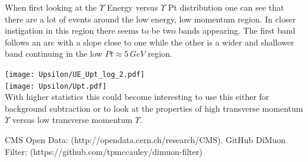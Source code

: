 \documentclass[a4paper, 11pt]{article}
\begin{document}
When first looking at the $\Upsilon$ Energy versus $\Upsilon$ Pt distribution one can see that there are a lot of events around the low energy, low momentum region.  In closer instigation in this region there seems to be two bands appearing.  The first band follows an arc with a slope close to one while the other is a wider and shallower band continuing in the low $Pt \approx 5\,GeV$ region.

\texttt{[image: Upsilon/UE\_Upt\_log\_2.pdf]} \\
\texttt{[image: Upsilon/Upt.pdf]} \\

With higher statistics this could become interesting to use this either for background subtraction or to look at the properties of high transverse momentum $\Upsilon$ versus low transverse momentum $\Upsilon$.

\begin{thebibliography}{}
  CMS Open Data: (http://opendata.cern.ch/research/CMS).
 GitHub DiMuon Filter: (https://github.com/tpmccauley/dimuon-filter)
\end{thebibliography}
\end{document}
